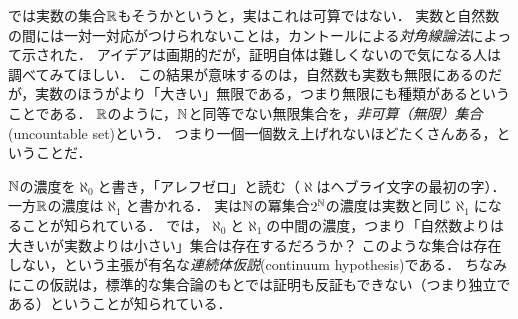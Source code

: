 \documentclass[11pt,a4paper]{bxjsarticle}
\begin{document}
では実数の集合$\mathbb{R}$もそうかというと，実はこれは可算ではない．
実数と自然数の間には一対一対応がつけられないことは，カントールによる\emph{対角線論法}によって示された．
アイデアは画期的だが，証明自体は難しくないので気になる人は調べてみてほしい．
この結果が意味するのは，自然数も実数も無限にあるのだが，実数のほうがより「大きい」無限である，つまり無限にも種類があるということである．
$\mathbb{R}$のように，$\mathbb{N}$と同等でない無限集合を，\emph{非可算（無限）集合}(uncountable set)という．
つまり一個一個数え上げれないほどたくさんある，ということだ．

\begin{hatten}{}{}
 $\mathbb{N}$の濃度を$\aleph_0$と書き，「アレフゼロ」と読む（$\aleph$はヘブライ文字の最初の字）．
一方$\mathbb{R}$の濃度は$\aleph_1$と書かれる．
実は$\mathbb{N}$の冪集合$2^{\mathbb{N}}$の濃度は実数と同じ$\aleph_1$になることが知られている．
では，$\aleph_0$と$\aleph_1$の中間の濃度，つまり「自然数よりは大きいが実数よりは小さい」集合は存在するだろうか？
このような集合は存在しない，という主張が有名な\emph{連続体仮説}(continuum hypothesis)である．
ちなみにこの仮説は，標準的な集合論のもとでは証明も反証もできない（つまり独立である）ということが知られている．
\end{hatten}
\end{document}

